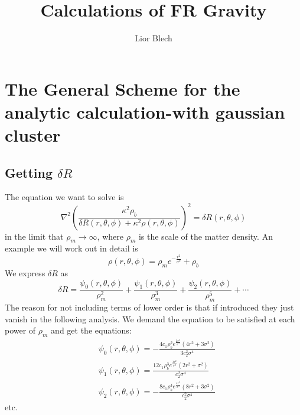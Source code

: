 \documentclass[10pt,a4paper]{report}
\author{Lior Blech}
\title{Calculations of FR Gravity}
\begin{document}
\chapter{The General Scheme for the analytic calculation-with gaussian cluster}
\section{Getting $\delta R$}
The equation we want to solve is
\begin{equation}
\nabla^2\left(\frac{\kappa^2 \rho_b}{\delta R(r,\theta ,\phi)+\kappa^2 \rho (r,\theta ,\phi)}\right)^2=\delta R(r,\theta ,\phi)
\end{equation}
in the limit that $\rho_m\rightarrow\infty$, where $\rho_m$ is the scale of the matter density. An example we will work out in detail is 
\begin{equation}
\rho(r,\theta,\phi)=\rho_m e^{-\frac{r^2}{\sigma^2}}+\rho_b
\end{equation}
We express $\delta R$ as
\begin{equation}
\delta R=\frac{\psi_0(r,\theta,\phi)}{\rho_m^2}+\frac{\psi_1(r,\theta,\phi)}{\rho_m^3}+\frac{\psi_2(r,\theta,\phi)}{\rho_m^5}+\cdots
\end{equation}
The reason for not including terms of lower order is that if introduced they just vanish in the following analysis. We demand the equation to be satisfied at each power of $\rho_m$ and get the equations:
\begin{subequations}
\begin{align}
&\psi_0(r,\theta ,\phi)=-\frac{4c_1 \rho_b^2 e^{\frac{2 r^2}{\sigma^2}} \left(4 r^2+3 \sigma ^2\right)}{3c_2^2 \sigma^4}\\
&\psi_1(r,\theta ,\phi)=\frac{12c_1 \rho_b^3 e^{\frac{3 r^2}{\sigma^2}} \left(2 r^2+\sigma ^2\right)}{c_2^2 \sigma^4}\\
&\psi_2(r,\theta ,\phi)=-\frac{8 c_1\rho_b^4 e^{\frac{4 r^2}{\sigma^2}} \left(8 r^2+3 \sigma^2\right)}{c_2^2 \sigma^4}
\end{align}
\end{subequations}
etc.
\end{document}
